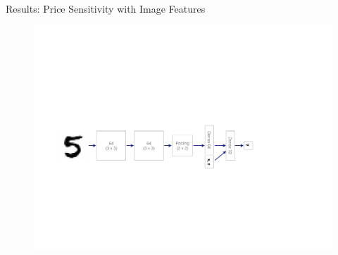 \documentclass[xcolor={dvipsnames}]{beamer}
\begin{document}
    \begin{frame}{Results: Price Sensitivity with Image Features}


        \begin{minipage}[c]{0.5\textwidth}
            \begin{figure}
                \centering
                \includegraphics[width=1.5\textwidth, angle=90]{figures/convnet}
            \end{figure}


\end{minipage}
\end{frame}
\end{document}
